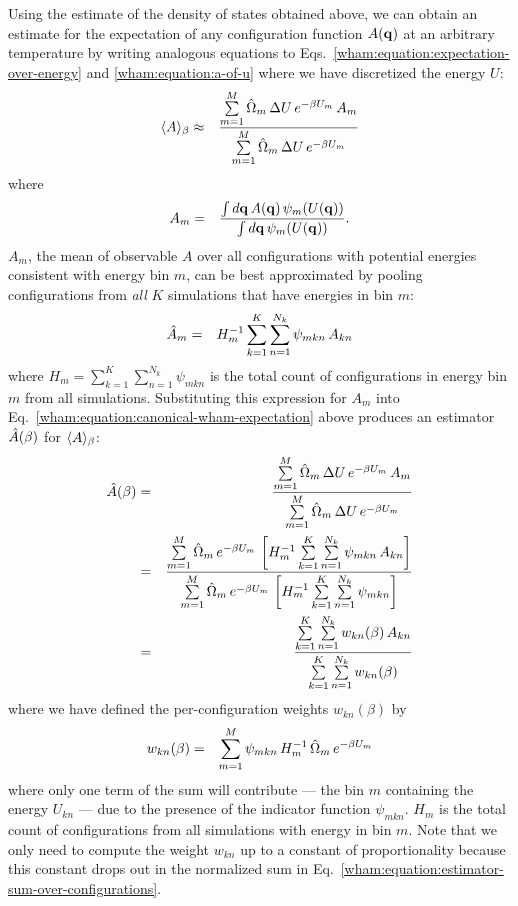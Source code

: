Using the estimate of the density of states obtained above, we can obtain an estimate for the expectation of any configuration function $A({\bf q})$ at an arbitrary temperature by writing analogous equations to Eqs.\ \ref{wham:equation:expectation-over-energy} and \ref{wham:equation:a-of-u} where we have discretized the energy $U$:
\begin{eqnarray}
\langle A \rangle_\beta &\approx& \frac{\sum\limits_{m=1}^M \hat{\Omega}_m \, \Delta U \, e^{-\beta U_m} \, A_m}{\sum\limits_{m=1}^M \hat{\Omega}_m \, \Delta U \, e^{-\beta U_m}} \label{wham:equation:canonical-wham-expectation}
\end{eqnarray}
where
\begin{eqnarray}
A_m &=& \frac{\int d{\bf q} \, A({\bf q}) \, \psi_m(U({\bf q}))}{\int d{\bf q} \, \psi_m(U({\bf q}))} .
\end{eqnarray}
$A_m$, the mean of observable $A$ over all configurations with potential energies consistent with energy bin $m$, can be best approximated by pooling configurations from \emph{all} $K$ simulations that have energies in bin $m$:
\begin{eqnarray}
\hat{A}_m &=& H_m^{-1} \sum\limits_{k=1}^K \sum\limits_{n=1}^{N_k} \psi_{mkn} \, A_{kn} 
\end{eqnarray}
where $H_m = \sum_{k=1}^K \sum_{n=1}^{N_k} \psi_{mkn}$ is the total count of configurations in energy bin $m$ from all simulations. Substituting this expression for $A_m$ into Eq.\ \ref{wham:equation:canonical-wham-expectation} above produces an estimator $\hat{A}(\beta)$ for $\langle A \rangle_\beta$:
\begin{eqnarray}
\hat{A}(\beta) &=& \frac{\sum\limits_{m=1}^M \hat{\Omega}_m \, \Delta U \, e^{-\beta U_m} \, A_m}{\sum\limits_{m=1}^M \hat{\Omega}_m \, \Delta U \, e^{-\beta U_m}} \nonumber \\
&=& \frac{\sum\limits_{m=1}^M \hat{\Omega}_m \, e^{-\beta U_m} \, \left[ H_m^{-1} \sum\limits_{k=1}^K \sum\limits_{n=1}^{N_k} \psi_{mkn} \, A_{kn} \right]}{\sum\limits_{m=1}^M \hat{\Omega}_m \, e^{-\beta U_m} \, \left[ H_m^{-1} \sum\limits_{k=1}^K \sum\limits_{n=1}^{N_k} \psi_{mkn} \right]} \nonumber \\
&=& \frac{\sum\limits_{k=1}^K \sum\limits_{n=1}^{N_k} w_{kn}(\beta) \, A_{kn}}{\sum\limits_{k=1}^K \sum\limits_{n=1}^{N_k} w_{kn}(\beta)} \label{wham:equation:estimator-sum-over-configurations}
\end{eqnarray}
where we have defined the per-configuration weights $w_{kn}(\beta)$ by
\begin{eqnarray}
w_{kn}(\beta) &=& \sum_{m=1}^M \psi_{mkn} \, H_m^{-1} \, \hat{\Omega}_m \, e^{-\beta U_m} \label{wham:equation:configuration-weight}
\end{eqnarray}
where only one term of the sum will contribute --- the bin $m$ containing the energy $U_{kn}$ --- due to the presence of the indicator function $\psi_{mkn}$.  $H_m$ is the total count of configurations from all simulations with energy in bin $m$.  Note that we only need to compute the weight $w_{kn}$ up to a constant of proportionality because this constant drops out in the normalized sum in Eq.\ \ref{wham:equation:estimator-sum-over-configurations}.

